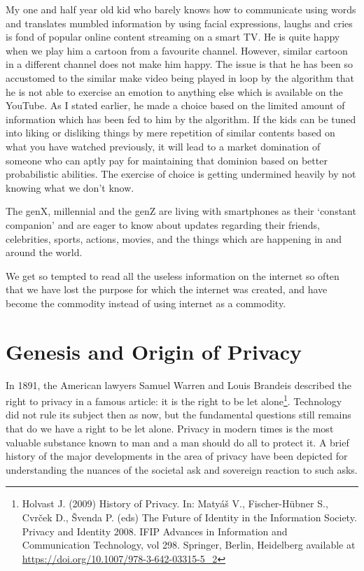 \begin{multicols}{2}
My one and half year old kid who barely knows how to communicate using words and translates mumbled information by using facial expressions, laughs and cries is fond of popular online content streaming on a smart TV. He is quite happy when we play him a cartoon from a favourite channel. However, similar cartoon in a different channel does not make him happy. The issue is that he has been so accustomed to the similar make video being played in loop by the algorithm that he is not able to exercise an emotion to anything else which is available on the YouTube. As I stated earlier, he made a choice based on the limited amount of information which has been fed to him by the algorithm. If the kids can be tuned into liking or disliking things by mere repetition of similar contents based on what you have watched previously, it will lead to a market domination of someone who can aptly pay for maintaining that dominion based on better probabilistic abilities. The exercise of choice is getting undermined heavily by not knowing what we don’t know.

The genX, millennial and the genZ are living with smartphones as their ‘constant companion’ and are eager to know about updates regarding their friends, celebrities, sports, actions, movies, and the things which are happening in and around the world.

We get so tempted to read all the useless information on the internet so often that we have lost the purpose for which the internet was created, and have become the commodity instead of using internet as a commodity.

\section{Genesis and Origin of Privacy}

In 1891, the American lawyers Samuel Warren and Louis Brandeis described the right to privacy in a famous article: it is the right to be let alone\footnote{Holvast J. (2009) History of Privacy. In: Matyáš V., Fischer-Hübner S., Cvrček D., Švenda P. (eds) The Future of Identity in the Information Society. Privacy and Identity 2008. IFIP Advances in Information and Communication Technology, vol 298. Springer, Berlin, Heidelberg available at\url{ https://doi.org/10.1007/978-3-642-03315-5\_2}}. Technology did not rule its subject then as now, but the fundamental questions still remains that do we have a right to be let alone. Privacy in modern times is the most valuable substance known to man and a man should do all to protect it. A brief history of the major developments in the area of privacy have been depicted for understanding the nuances of the societal ask and sovereign reaction to such asks.


\end{multicols}
